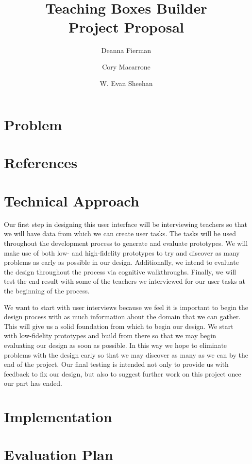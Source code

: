 \documentclass[11pt,letter]{article}
\title{Teaching Boxes Builder\\Project Proposal}
\author{Deanna Fierman \and Cory Macarrone \and W. Evan Sheehan}
\begin{document}
\begin{titlepage}
	\maketitle
	\thispagestyle{empty}
\end{titlepage}

\section{Problem}

\section{References}

\section{Technical Approach}
Our first step in designing this user interface will be interviewing teachers so
that we will have data from which we can create user tasks. The tasks will be
used throughout the development process to generate and evaluate prototypes. We
will make use of both low- and high-fidelity prototypes to try and discover as
many problems as early as possible in our design. Additionally, we intend to
evaluate the design throughout the process via cognitive walkthroughs. Finally,
we will test the end result with some of the teachers we interviewed for our
user tasks at the beginning of the process.

We want to start with user interviews because we feel it is important to begin
the design process with as much information about the domain that we can gather.
This will give us a solid foundation from which to begin our design. We start
with low-fidelity prototypes and build from there so that we may begin
evaluating our design as soon as possible. In this way we hope to eliminate
problems with the design early so that we may discover as many as we can by the
end of the project. Our final testing is intended not only to provide us with
feedback to fix our design, but also to suggest further work on this project
once our part has ended.

\section{Implementation}

\section{Evaluation Plan}
\end{document}

